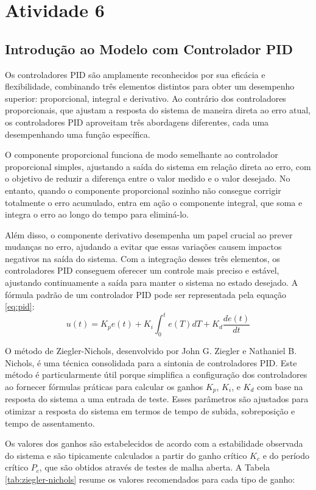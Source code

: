 \section{Atividade 6}
\subsection{Introdução ao Modelo com Controlador PID}
Os controladores PID são amplamente reconhecidos por sua eficácia e flexibilidade, combinando três elementos distintos para obter um desempenho superior: proporcional, integral e derivativo. Ao contrário dos controladores proporcionais, que ajustam a resposta do sistema de maneira direta ao erro atual, os controladores PID aproveitam três abordagens diferentes, cada uma desempenhando uma função específica.

O componente proporcional funciona de modo semelhante ao controlador proporcional simples, ajustando a saída do sistema em relação direta ao erro, com o objetivo de reduzir a diferença entre o valor medido e o valor desejado. No entanto, quando o componente proporcional sozinho não consegue corrigir totalmente o erro acumulado, entra em ação o componente integral, que soma e integra o erro ao longo do tempo para eliminá-lo.

Além disso, o componente derivativo desempenha um papel crucial ao prever mudanças no erro, ajudando a evitar que essas variações causem impactos negativos na saída do sistema. Com a integração desses três elementos, os controladores PID conseguem oferecer um controle mais preciso e estável, ajustando continuamente a saída para manter o sistema no estado desejado.
A fórmula padrão de um controlador PID pode ser representada pela equação \ref{eq:pid}:
\begin{equation}
    u(t) = K_p e(t) + K_i \int_{0}^{t} e(T) dT + K_d \frac{d e(t)}{dt}
    \label{eq:pid}
\end{equation}

O método de Ziegler-Nichols, desenvolvido por John G. Ziegler e Nathaniel B. Nichols, é uma técnica consolidada para a sintonia de controladores PID. Este método é particularmente útil porque simplifica a configuração dos controladores ao fornecer fórmulas práticas para calcular os ganhos \( K_p \), \( K_i \), e \( K_d \) com base na resposta do sistema a uma entrada de teste. Esses parâmetros são ajustados para otimizar a resposta do sistema em termos de tempo de subida, sobreposição e tempo de assentamento.

Os valores dos ganhos são estabelecidos de acordo com a estabilidade observada do sistema e são tipicamente calculados a partir do ganho crítico \( K_c \) e do período crítico \( P_c \), que são obtidos através de testes de malha aberta. A Tabela \ref{tab:ziegler-nichols} resume os valores recomendados para cada tipo de ganho:

